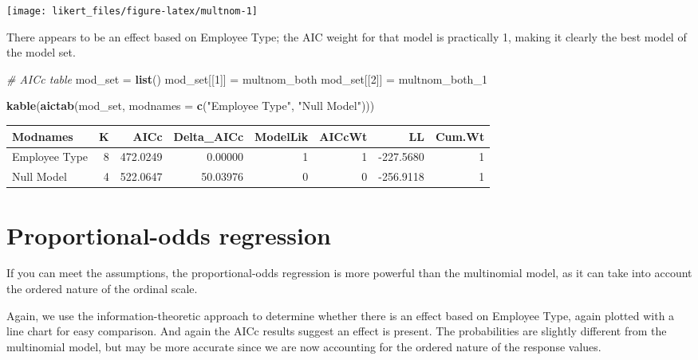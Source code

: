\documentclass[]{book}
\newenvironment{Shaded}{\begin{snugshade}}{\end{snugshade}}
\newcommand{\KeywordTok}[1]{\textcolor[rgb]{0.13,0.29,0.53}{\textbf{{#1}}}}
\newcommand{\DataTypeTok}[1]{\textcolor[rgb]{0.13,0.29,0.53}{{#1}}}
\newcommand{\DecValTok}[1]{\textcolor[rgb]{0.00,0.00,0.81}{{#1}}}
\newcommand{\StringTok}[1]{\textcolor[rgb]{0.31,0.60,0.02}{{#1}}}
\newcommand{\CommentTok}[1]{\textcolor[rgb]{0.56,0.35,0.01}{\textit{{#1}}}}
\newcommand{\NormalTok}[1]{{#1}}
\begin{document}
\begin{center}\texttt{[image: likert\_files/figure-latex/multnom-1]} \end{center}

There appears to be an effect based on Employee Type; the AIC weight for
that model is practically 1, making it clearly the best model of the
model set.

\begin{Shaded}
\begin{Highlighting}[]
\CommentTok{# AICc table}
\NormalTok{mod_set =}\StringTok{ }\KeywordTok{list}\NormalTok{()}
    \NormalTok{mod_set[[}\DecValTok{1}\NormalTok{]] =}\StringTok{ }\NormalTok{multnom_both}
    \NormalTok{mod_set[[}\DecValTok{2}\NormalTok{]] =}\StringTok{ }\NormalTok{multnom_both_1}

\KeywordTok{kable}\NormalTok{(}\KeywordTok{aictab}\NormalTok{(mod_set, }\DataTypeTok{modnames =} \KeywordTok{c}\NormalTok{(}\StringTok{"Employee Type"}\NormalTok{, }\StringTok{"Null Model"}\NormalTok{)))}
\end{Highlighting}
\end{Shaded}

\begin{tabular}{l|r|r|r|r|r|r|r}
\hline
Modnames & K & AICc & Delta\_AICc & ModelLik & AICcWt & LL & Cum.Wt\\
\hline
Employee Type & 8 & 472.0249 & 0.00000 & 1 & 1 & -227.5680 & 1\\
\hline
Null Model & 4 & 522.0647 & 50.03976 & 0 & 0 & -256.9118 & 1\\
\hline
\end{tabular}

\section{Proportional-odds
regression}\label{proportional-odds-regression}

If you can meet the assumptions, the proportional-odds regression is
more powerful than the multinomial model, as it can take into account
the ordered nature of the ordinal scale.

Again, we use the information-theoretic approach to determine whether
there is an effect based on Employee Type, again plotted with a line
chart for easy comparison. And again the AICc results suggest an effect
is present. The probabilities are slightly different from the
multinomial model, but may be more accurate since we are now accounting
for the ordered nature of the response values.
\end{document}
